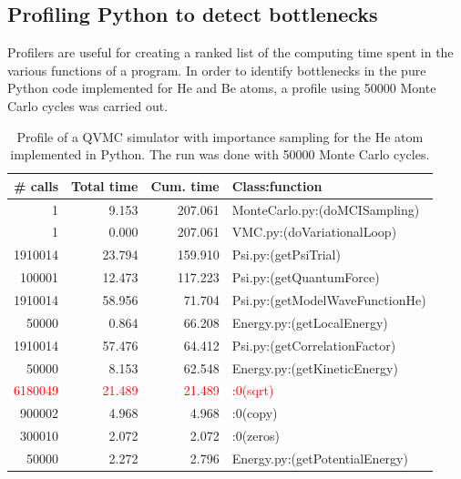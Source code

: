 \subsection{Profiling Python to detect bottlenecks}

Profilers are useful for creating a ranked list of the computing time spent in the various functions of a program. In order to identify bottlenecks in the pure Python code implemented for He and Be atoms, a profile using 50000 Monte Carlo cycles was carried out. 

\begin{table}
\centering
\begin{tabular}{rrrl}
\toprule[1pt]
\textbf{\# calls} & \textbf{Total time} & \textbf{Cum. time} & \textbf{Class:function}\\
\midrule[1pt]
			1  &  9.153 &   207.061  & \footnotesize{MonteCarlo.py:(doMCISampling)}\\
			1  &  0.000 &   207.061  & \footnotesize{VMC.py:(doVariationalLoop)}\\
1910014  & 23.794 &   159.910  & \footnotesize{Psi.py:(getPsiTrial)}\\
	100001 & 12.473 &   117.223  & \footnotesize{Psi.py:(getQuantumForce)}\\
1910014  & 58.956 &   71.704   & \footnotesize{Psi.py:(getModelWaveFunctionHe)}\\
	50000  &  0.864 &  66.208    & \footnotesize{Energy.py:(getLocalEnergy)}\\
1910014  & 57.476 &   64.412   & \footnotesize{Psi.py:(getCorrelationFactor)}\\
	50000  &  8.153 &  62.548    & \footnotesize{Energy.py:(getKineticEnergy)}\\
\textcolor{red}{6180049}  &  \textcolor{red}{21.489} & \textcolor{red}{21.489}    & \textcolor{red}{\footnotesize{:0(sqrt)}}\\
	900002  &  4.968 &  4.968    & \footnotesize{:0(copy)}\\
	300010  &  2.072 &  2.072    & \footnotesize{:0(zeros)}\\
	50000  &  2.272  &  2.796    & \footnotesize{Energy.py:(getPotentialEnergy)}\\
\bottomrule[1pt]
\end{tabular}\caption{Profile of a QVMC simulator with importance sampling for the He atom implemented in Python. The run was done with 50000 Monte Carlo cycles.}
\label{profileHe}
\end{table}



